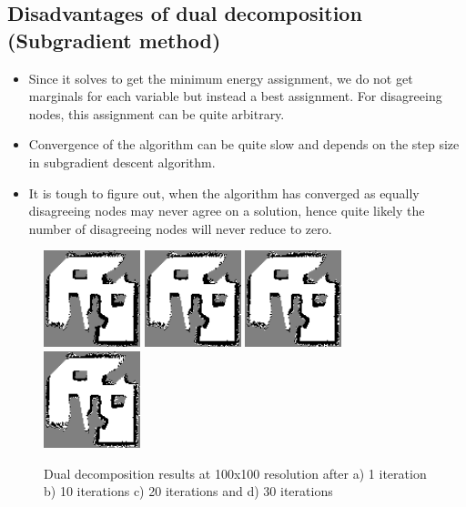 \documentclass[10pt,oneside,letterpaper]{article}
\begin{document}
\subsection{Disadvantages of dual decomposition (Subgradient method)}
\begin{itemize}
  \item Since it solves to get the minimum energy assignment, we do not get marginals for each variable but instead a best assignment. For disagreeing nodes, this assignment can be quite arbitrary.
  \item Convergence of the algorithm can be quite slow and depends on the step size in subgradient descent algorithm.
  \item It is tough to figure out, when the algorithm has converged as equally disagreeing nodes may never agree on a solution, hence quite likely the number of disagreeing nodes will never reduce to zero.
\end{itemize}
\begin{figure}
  \includegraphics[width=0.25\textwidth]{dualdecomposition0_100x100.png}%
  \includegraphics[width=0.25\textwidth]{dualdecomposition10_100x100.png}%
  \includegraphics[width=0.25\textwidth]{dualdecomposition20_100x100.png}%
  \includegraphics[width=0.25\textwidth]{dualdecomposition30_100x100.png}
  \caption{Dual decomposition results at 100x100 resolution after a) 1 iteration b) 10 iterations c) 20 iterations and d) 30 iterations}
  \label{fig:dualdecomposition}
\end{figure}
\end{document}
